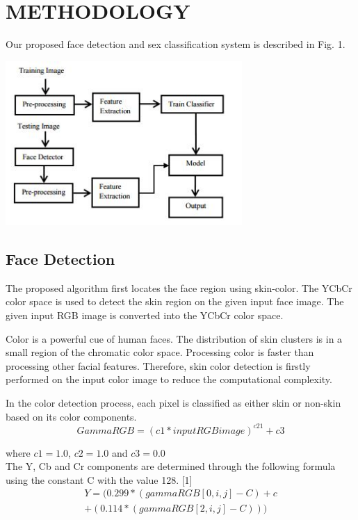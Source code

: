 \documentclass[journal]{IEEEtran}
\begin{document}
	\section{\textbf{METHODOLOGY}}
	Our proposed face detection and sex classification system is
	described in Fig. 1.\\
	\begin{minipage}{\linewidth}
		\centering
		\includegraphics[width = 90mm]{Methodology.JPG}
	\end{minipage} 
	
	\subsection{\textbf{Face Detection}}
	   The proposed algorithm first locates the face region
	using skin-color. The YCbCr color space is used to detect
	the skin region on the given input face image. The given
	input RGB image is converted into the YCbCr color
	space.
	
	
	  Color is a powerful cue of human faces. The
	distribution of skin clusters is in a small region of the
	chromatic color space. Processing color is faster than
	processing other facial features. Therefore, skin color
	detection is firstly performed on the input color image to
	reduce the computational complexity.
	
	In the color detection process, each pixel is classified as
	either skin or non-skin based on its color components.
	 \begin{equation}
	  GammaRGB=(c1*inputRGBimage)^{c21} + c3
	 \end{equation}
	
	where $c1=1.0$, $c2=1.0$ and $c3=0.0$\vspace{1mm}\\
	 
	 The Y, Cb and Cr components are determined through
	the following formula using the constant C with the value
	128. [1]
	\begin{equation}
	\begin{split}
	Y=(0.299*(gammaRGB[0,i,j]-C)+c\\
	+(0.114*(gammaRGB[2,i,j]-C)))
	\end{split}
	\end{equation}
	
\end{document}
